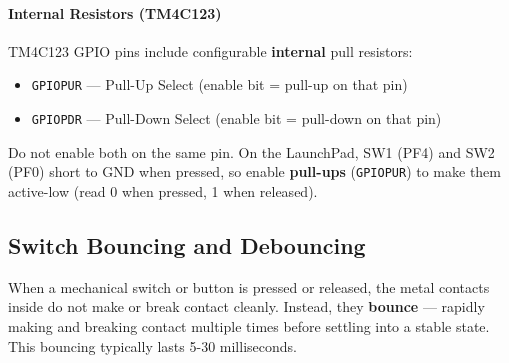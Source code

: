 \paragraph{Internal Resistors (TM4C123)}
TM4C123 GPIO pins include configurable \textbf{internal} pull resistors:
\begin{itemize}[noitemsep, topsep=2pt]
  \item \texttt{GPIOPUR} — Pull-Up Select (enable bit = pull-up on that pin)
  \item \texttt{GPIOPDR} — Pull-Down Select (enable bit = pull-down on that pin)
\end{itemize}
Do not enable both on the same pin. On the LaunchPad, SW1 (PF4) and SW2 (PF0) short to GND when pressed, so enable \textbf{pull-ups} (\texttt{GPIOPUR}) to make them active-low (read 0 when pressed, 1 when released).

\subsection{Switch Bouncing and Debouncing}

When a mechanical switch or button is pressed or released, the metal contacts inside do not make or break contact cleanly. Instead, they \textbf{bounce} — rapidly making and breaking contact multiple times before settling into a stable state. This bouncing typically lasts 5-30 milliseconds.

